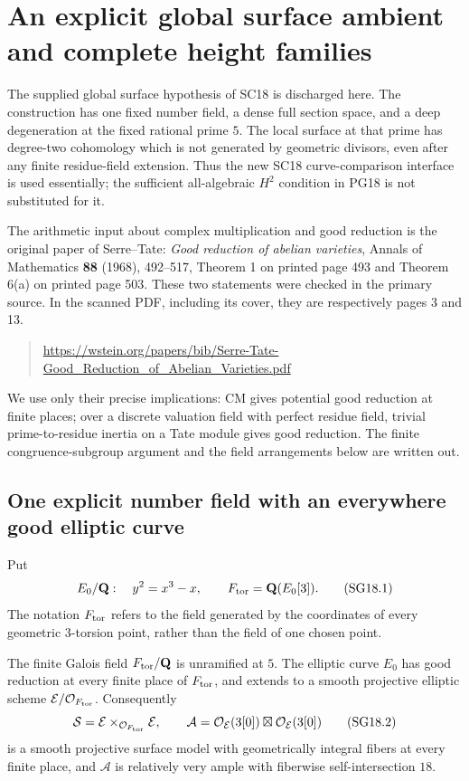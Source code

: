 \section{An explicit global surface ambient and complete height families}
\label{r18sg:section}

The supplied global surface hypothesis of SC18 is discharged here.
The construction has one fixed number field, a dense full section
space, and a deep degeneration at the fixed rational prime \(5\).
The local surface at that prime has degree-two cohomology which
is not generated by geometric divisors, even after any finite
residue-field extension.  Thus the new SC18 curve-comparison
interface is used essentially; the sufficient all-algebraic
\(H^2\) condition in PG18 is not substituted for it.

The arithmetic input about complex multiplication and good
reduction is the original paper of Serre--Tate:
\emph{Good reduction of abelian varieties}, Annals of Mathematics
\textbf{88} (1968), 492--517, Theorem 1 on printed page 493 and
Theorem 6(a) on printed page 503.  These two statements were
checked in the primary source.  In the scanned PDF, including
its cover, they are respectively pages 3 and 13.
\begin{quote}
\url{https://wstein.org/papers/bib/Serre-Tate-Good_Reduction_of_Abelian_Varieties.pdf}
\end{quote}
We use only their precise implications: CM gives potential good
reduction at finite places; over a discrete valuation field with
perfect residue field, trivial prime-to-residue inertia on a
Tate module gives good reduction.  The finite congruence-subgroup
argument and the field arrangements below are written out.

\subsection{One explicit number field with an everywhere good elliptic curve}

Put
\[
 E_0/\mathbf Q:\quad y^2=x^3-x,\qquad
 F_{\rm tor}=\mathbf Q(E_0[3]).
 \tag{SG18.1}\label{r18sg:torsion-field}
\]
The notation \(F_{\rm tor}\) refers to the field generated by
the coordinates of every geometric \(3\)-torsion point, rather
than the field of one chosen point.

\begin{lemma}
\label{r18sg:global-good}
The finite Galois field \(F_{\rm tor}/\mathbf Q\) is unramified
at \(5\).  The elliptic curve \(E_0\) has good reduction at every
finite place of \(F_{\rm tor}\), and extends to a smooth
projective elliptic scheme
\(\mathcal E/\mathcal O_{F_{\rm tor}}\).
Consequently
\[
 \mathcal S=\mathcal E\times_{\mathcal O_{F_{\rm tor}}}\mathcal E,
 \qquad
 \mathcal A=
   \mathcal O_{\mathcal E}(3[0])
      \boxtimes\mathcal O_{\mathcal E}(3[0])
 \tag{SG18.2}\label{r18sg:surface}
\]
is a smooth projective surface model with geometrically
integral fibers at every finite place, and \(\mathcal A\)
is relatively very ample with fiberwise self-intersection \(18\).
\end{lemma}

